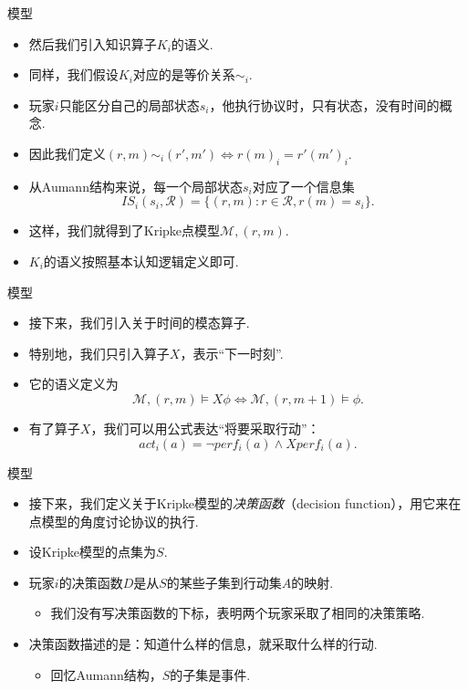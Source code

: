 {模型}
\begin{itemize}
    \item 然后我们引入知识算子$K_i$的语义.
    \item 同样，我们假设$K_i$对应的是等价关系$\sim_i$.
    \item 玩家$i$只能区分自己的局部状态$s_i$，他执行协议时，只有状态，没有时间的概念.
    \item 因此我们定义$(r,m)\sim_i (r',m')\iff r(m)_i=r'(m')_i$.
    \item 从Aumann结构来说，每一个局部状态$s_i$对应了一个信息集
    \[IS_i(s_i,\mathcal R)=\{(r,m):r\in\mathcal R,r(m)=s_i\}.\]
    \item 这样，我们就得到了Kripke点模型$\mathcal M,(r,m)$.
    \item $K_i$的语义按照基本认知逻辑定义即可.
\end{itemize}


{模型}
\begin{itemize}
    \item 接下来，我们引入关于时间的模态算子.
    \item 特别地，我们只引入算子$X$，表示“下一时刻”.
    \item 它的语义定义为
    \[\mathcal M,(r,m)\vDash X\phi\iff\mathcal M,(r,m+1)\vDash\phi.\]
    \item 有了算子$X$，我们可以用公式表达“将要采取行动”：
    \[act_i(a)=\neg perf_i(a)\wedge X perf_i(a).\]
\end{itemize}



{模型}
\begin{itemize}
    \item 接下来，我们定义关于Kripke模型的\emph{决策函数}（decision function），用它来在点模型的角度讨论协议的执行.
    \item 设Kripke模型的点集为$S$.
    \item 玩家$i$的决策函数$D$是从$S$的某些子集到行动集$A$的映射.
    \begin{itemize}
        \item 我们没有写决策函数的下标，表明两个玩家采取了相同的决策策略.
    \end{itemize}
    \item 决策函数描述的是：知道什么样的信息，就采取什么样的行动.
    \begin{itemize}
        \item 回忆Aumann结构，$S$的子集是事件.
    \end{itemize}
\end{itemize}


